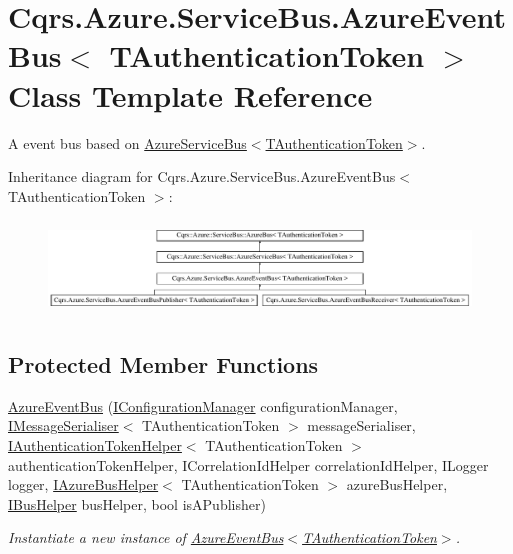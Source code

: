 \hypertarget{classCqrs_1_1Azure_1_1ServiceBus_1_1AzureEventBus}{}\section{Cqrs.\+Azure.\+Service\+Bus.\+Azure\+Event\+Bus$<$ T\+Authentication\+Token $>$ Class Template Reference}
\label{classCqrs_1_1Azure_1_1ServiceBus_1_1AzureEventBus}


A event bus based on \hyperlink{classCqrs_1_1Azure_1_1ServiceBus_1_1AzureServiceBus_a09e34bafdb96fb8136efa428df9f80b2_a09e34bafdb96fb8136efa428df9f80b2}{Azure\+Service\+Bus$<$\+T\+Authentication\+Token$>$}.  


Inheritance diagram for Cqrs.\+Azure.\+Service\+Bus.\+Azure\+Event\+Bus$<$ T\+Authentication\+Token $>$\+:\begin{figure}[H]
\begin{center}
\leavevmode
\includegraphics[height=2.533937cm]{classCqrs_1_1Azure_1_1ServiceBus_1_1AzureEventBus}
\end{center}
\end{figure}
\subsection*{Protected Member Functions}
\begin{DoxyCompactItemize}
\item 
\hyperlink{classCqrs_1_1Azure_1_1ServiceBus_1_1AzureEventBus_aaaf74d2e4e79924b7231750478508ed6_aaaf74d2e4e79924b7231750478508ed6}{Azure\+Event\+Bus} (\hyperlink{interfaceCqrs_1_1Configuration_1_1IConfigurationManager}{I\+Configuration\+Manager} configuration\+Manager, \hyperlink{interfaceCqrs_1_1Azure_1_1ServiceBus_1_1IMessageSerialiser}{I\+Message\+Serialiser}$<$ T\+Authentication\+Token $>$ message\+Serialiser, \hyperlink{interfaceCqrs_1_1Authentication_1_1IAuthenticationTokenHelper}{I\+Authentication\+Token\+Helper}$<$ T\+Authentication\+Token $>$ authentication\+Token\+Helper, I\+Correlation\+Id\+Helper correlation\+Id\+Helper, I\+Logger logger, \hyperlink{interfaceCqrs_1_1Azure_1_1ServiceBus_1_1IAzureBusHelper}{I\+Azure\+Bus\+Helper}$<$ T\+Authentication\+Token $>$ azure\+Bus\+Helper, \hyperlink{interfaceCqrs_1_1Bus_1_1IBusHelper}{I\+Bus\+Helper} bus\+Helper, bool is\+A\+Publisher)
\begin{DoxyCompactList}\small\item\em Instantiate a new instance of \hyperlink{classCqrs_1_1Azure_1_1ServiceBus_1_1AzureEventBus_aaaf74d2e4e79924b7231750478508ed6_aaaf74d2e4e79924b7231750478508ed6}{Azure\+Event\+Bus$<$\+T\+Authentication\+Token$>$}. \end{DoxyCompactList}\end{DoxyCompactItemize}
